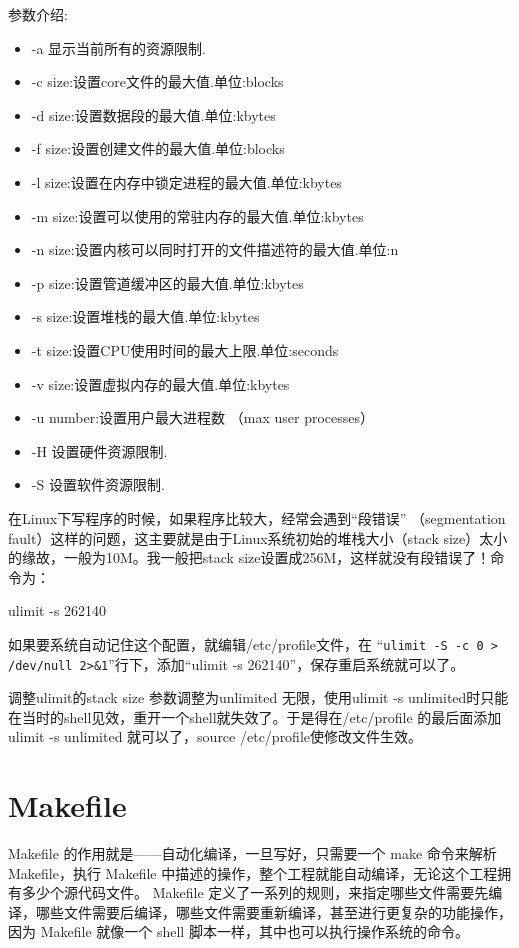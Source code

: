 参数介绍:
\begin{itemize}
\item -a 显示当前所有的资源限制.
\item -c size:设置core文件的最大值.单位:blocks
\item -d size:设置数据段的最大值.单位:kbytes
\item -f size:设置创建文件的最大值.单位:blocks
\item -l size:设置在内存中锁定进程的最大值.单位:kbytes
\item -m size:设置可以使用的常驻内存的最大值.单位:kbytes
\item -n size:设置内核可以同时打开的文件描述符的最大值.单位:n
\item -p size:设置管道缓冲区的最大值.单位:kbytes
\item -s size:设置堆栈的最大值.单位:kbytes
\item -t size:设置CPU使用时间的最大上限.单位:seconds
\item -v size:设置虚拟内存的最大值.单位:kbytes
\item -u number:设置用户最大进程数 （max user processes）
\item -H 设置硬件资源限制.
\item -S 设置软件资源限制.
\end{itemize}

在Linux下写程序的时候，如果程序比较大，经常会遇到“段错误” （segmentation fault）这样的问题，这主要就是由于Linux系统初始的堆栈大小（stack size）太小的缘故，一般为10M。我一般把stack size设置成256M，这样就没有段错误了！命令为：

ulimit   -s 262140

如果要系统自动记住这个配置，就编辑/etc/profile文件，在 “\verb|ulimit -S -c 0 > /dev/null 2>&1|”行下，添加“ulimit   -s 262140”，保存重启系统就可以了。

调整ulimit的stack size 参数调整为unlimited 无限，使用ulimit -s unlimited时只能在当时的shell见效，重开一个shell就失效了。于是得在/etc/profile 的最后面添加ulimit -s unlimited 就可以了，source /etc/profile使修改文件生效。





\section{Makefile}
Makefile 的作用就是——自动化编译，一旦写好，只需要一个 make 命令来解析 Makefile，执行 Makefile 中描述的操作，整个工程就能自动编译，无论这个工程拥有多少个源代码文件。 Makefile 定义了一系列的规则，来指定哪些文件需要先编译，哪些文件需要后编译，哪些文件需要重新编译，甚至进行更复杂的功能操作，因为 Makefile 就像一个 shell 脚本一样，其中也可以执行操作系统的命令。

